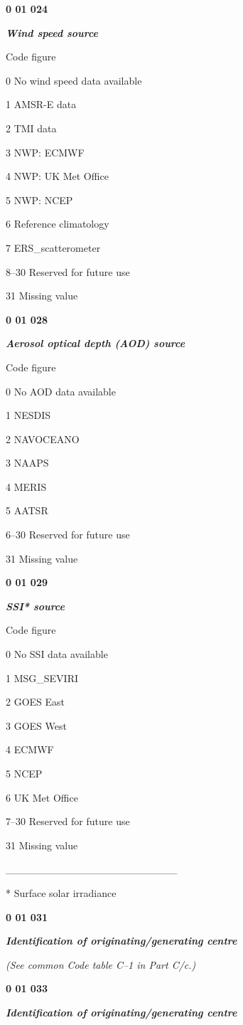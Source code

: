 \textbf{0 01 024}

\emph{\textbf{Wind speed source}}

Code figure

0 No wind speed data available

1 AMSR-E data

2 TMI data

3 NWP: ECMWF

4 NWP: UK Met Office

5 NWP: NCEP

6 Reference climatology

7 ERS\_scatterometer

8--30 Reserved for future use

31 Missing value

\textbf{0 01 028}

\emph{\textbf{Aerosol optical depth (AOD) source}}

Code figure

0 No AOD data available

1 NESDIS

2 NAVOCEANO

3 NAAPS

4 MERIS

5 AATSR

6--30 Reserved for future use

31 Missing value

\textbf{0 01 029}

\emph{\textbf{SSI* source}}

Code figure

0 No SSI data available

1 MSG\_SEVIRI

2 GOES East

3 GOES West

4 ECMWF

5 NCEP

6 UK Met Office

7--30 Reserved for future use

31 Missing value

\_\_\_\_\_\_\_\_\_\_\_\_\_\_\_\_\_\_\_\_\_\_\_

* Surface solar irradiance

\textbf{0 01 031}

\emph{\textbf{Identification of originating/generating centre}}

\emph{(See common Code table C--1 in Part C/c.)}

\textbf{0 01 033}

\emph{\textbf{Identification of originating/generating centre}}

